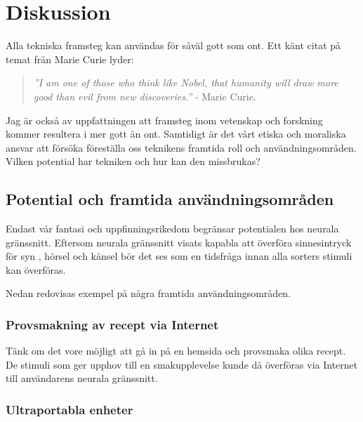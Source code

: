 \documentclass[12pt, a4paper]{article}
\begin{document}

\section{Diskussion}

Alla tekniska framsteg kan användas för såväl gott som ont. Ett känt citat på
temat från Marie Curie lyder:

\begin{quote}
	\textit{''I am one of those who think like Nobel, that humanity will draw
	more good than evil from new discoveries.''} - Marie Curie.
	\cite{curie_quote}
\end{quote}

Jag är också av uppfattningen att framsteg inom vetenskap och forskning kommer
resultera i mer gott än ont. Samtidigt är det vårt etiska och moraliska ansvar
att försöka föreställa oss teknikens framtida roll och användningsområden.
Vilken potential har tekniken och hur kan den missbrukas?


\subsection{Potential och framtida användningsområden}

Endast vår fantasi och uppfinningsrikedom begränsar potentialen hos neurala
gränssnitt. Eftersom neurala gränssnitt visats kapabla att överföra
sinnesintryck för syn \cite{sight1,sight2}, hörsel \cite{sound} och känsel
\cite{touch} bör det ses som en tidsfråga innan alla sorters stimuli kan
överföras.

Nedan redovisas exempel på några framtida användningsområden.

\subsubsection{Provsmakning av recept via Internet}

Tänk om det vore möjligt att gå in på en hemsida och provsmaka olika recept. De
stimuli som ger upphov till en smakupplevelse kunde då överföras via Internet
till användarens neurala gränssnitt.

\subsubsection{Ultraportabla enheter}
\end{document}
